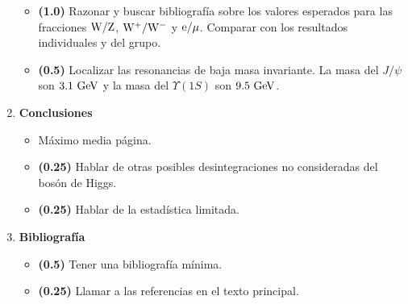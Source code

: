 \documentclass[11pt]{articulo}
\begin{document}
\begin{enumerate}
\begin{itemize}
\item {\bf (1.0)} Razonar y buscar bibliograf\'ia sobre los valores esperados para las fracciones ${\rm W/Z}$, ${\rm W^+/W^-}$ y ${\rm e/\mu}$. Comparar con los resultados individuales y del grupo.

\item {\bf (0.5)} Localizar las resonancias de baja masa invariante. La masa del $J/\psi$ son ${\rm 3.1~GeV}$ y la masa del $\Upsilon(1S)$ son ${\rm 9.5~GeV}$.

\end{itemize}

\item {\bf Conclusiones}

\begin{itemize}

\item M\'aximo media p\'agina.

\item {\bf (0.25)} Hablar de otras posibles desintegraciones no consideradas del bos\'on de Higgs.

\item {\bf (0.25)} Hablar de la estad\'istica limitada.

\end{itemize}

\item {\bf Bibliograf\'ia}

\begin{itemize}

\item {\bf (0.5)} Tener una bibliograf\'ia m\'inima.

\item {\bf (0.25)} Llamar a las referencias en el texto principal.

\end{itemize}

\end{enumerate}
\end{document}
